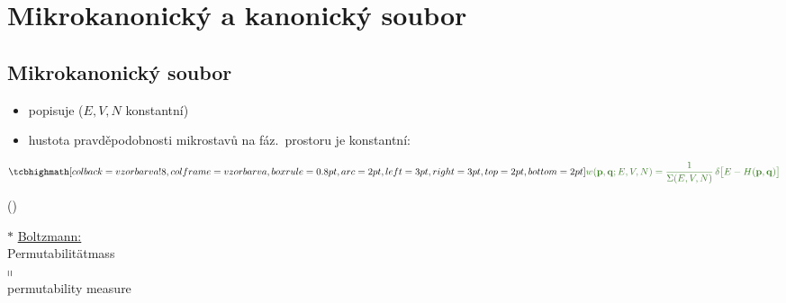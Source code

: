 \providecommand{\cancel}[1]{\tikz[baseline=(c.base)]{\node[inner sep=0pt] (c) {$\displaystyle #1$}; \draw (c.south west) -- (c.north east);}}
\section{Mikrokanonický a kanonický soubor}

\subsection*{Mikrokanonický soubor}
\begin{itemize}
  \item popisuje  ($E, V, N$ konstantní)
  \item hustota pravděpodobnosti mikrostavů na fáz.\ prostoru je konstantní:
\end{itemize}

\begin{minipage}{0.68\textwidth}
\[
  \vzorec{\textcolor{OliveGreen}{w(\mathbf p,\mathbf q; E,V,N) = \frac{1}{\Sigma(E,V,N)}\,\delta\big[E - H(\mathbf p,\mathbf q)\big]}}
\]
\begin{center}()\end{center}
\end{minipage}
\begin{minipage}{0.3\textwidth}
\textcolor{NavyBlue}{\textcircled{\small$*$} \underline{Boltzmann:} \\
Permutabilitätmass \\
\hspace*{1.2cm}$\shortparallel$ \\
permutability measure}
\end{minipage}

